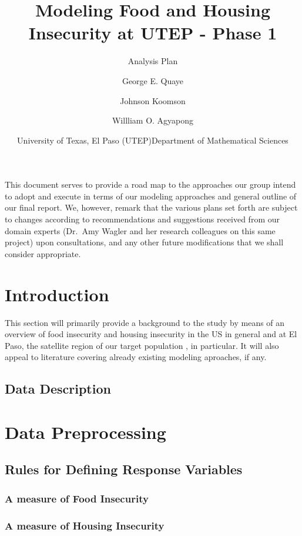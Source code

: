 \documentclass[
  10pt,
]{article}
\title{Modeling Food and Housing Insecurity at UTEP - Phase 1}
\subtitle{Analysis Plan}
\author{George E. Quaye \and Johnson Koomson \and Willliam O. Agyapong}
\date{\center University of Texas, El Paso (UTEP)\center \center Department of Mathematical Sciences \center}
\begin{document}
\maketitle

{
\hypersetup{linkcolor=}
\setcounter{tocdepth}{4}
\tableofcontents
}
\newpage

This document serves to provide a road map to the approaches our group intend to adopt and execute in terms of our modeling approaches and general outline of our final report. We, however, remark that the various plans set forth are subject to changes according to recommendations and suggestions received from our domain experts (Dr.~Amy Wagler and her research colleagues on this same project) upon consultations, and any other future modifications that we shall consider appropriate.

\section{Introduction}

This section will primarily provide a background to the study by means of an overview of food insecurity and housing insecurity in the US in general and at El Paso, the satellite region of our target population , in particular. It will also appeal to literature covering already existing modeling aproaches, if any.

\subsection{ Data Description}

\section{Data Preprocessing}

\subsection{Rules for Defining Response Variables}

\subsubsection{A measure of Food Insecurity}

\subsubsection{A measure of Housing Insecurity}
\end{document}
